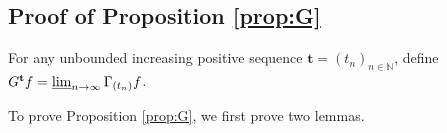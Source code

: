 \documentclass[12pt,a4paper]{amsart}
\numberwithin{equation}{section}
\theoremstyle{plain}
\theoremstyle{definition}
\theoremstyle{remark}
\begin{document}
\subsection{Proof of Proposition \ref{prop:G}}\label{sec:G}
	For any unbounded increasing positive sequence $\mathbf t = (t_n)_{n\in \mathbb N}$, define $G^\mathbf t f = \varliminf_{n\to \infty} \Gamma_{(t_n)} f$.

\begin{comment}	
	Since $(\Gamma_t)_{t\geq 0}$ are $[0,\infty]$-valued functionals, so is $G^{\mathbf t}$.
	Also, from $\Gamma_t(\infty  \mathbf 1_E) = \infty$ for all $t\geq 0$ we have that $G^{\mathbf t}(\infty  \mathbf 1_E) = \infty$.
	We claim that $G^\mathbf t$ is monotone concave.
	In fact, for each $f \leq g$ in $\mathcal B(E,[0,\infty])$, we have
	\begin{equation}
	G^{\mathbf t} f
	= \varliminf_{n\to \infty} \Gamma_{(t_n)} f
	\leq \varliminf_{n\to \infty} \Gamma_{(t_n)} g
	= G^{\mathbf t} g.
	\end{equation}
	On the other hand, using Lemma \ref{Fact:CP!}, we have for all $t\geq 0$, $f\in \mathcal B(E,[0,\infty])$, $u,v \in [0,\infty)$, $r\in [0,1]$, it holds that
	\begin{align}
	\Gamma_t((ru+(1-r) v)f)
	\geq r \Gamma_t (uf) + (1-r) \Gamma_t (vf).
	\end{align}
	Therefore, for all $f\in \mathcal B(E,[0,\infty])$, $u,v \in [0,\infty)$, $r \in [0,1]$, we have
	\begin{align}
	& G^{\mathbf t}((ru + (1-r)v)f)
	= \varliminf_{n \to \infty} \Gamma_{(t_n)}((ru + (1-r)v)f)
	\\&\geq \varliminf_{n\to \infty} (r\Gamma_{(t_n)} (uf) + (1-r)\Gamma_{(t_n)}(vf))
	\\&\geq r (\varliminf_{n\to \infty} \Gamma_{(t_n)} (uf)) + (1-r) (\varliminf_{n\to \infty} \Gamma_{(t_n)}(vf) )
	\\&= r G^{\mathbf t} (uf) + (1-r) G^{\mathbf t}(vf).
	\end{align}
\end{comment}

	To prove Proposition \ref{prop:G}, we first prove two lemmas.
\end{document}
